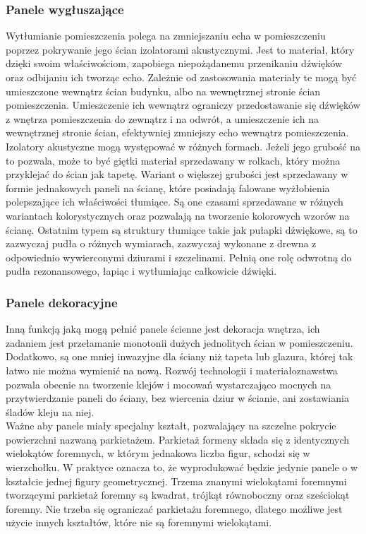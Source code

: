 \documentclass{article} %
\begin{document}
        \subsubsection{Panele wygłuszające}
        Wytłumianie pomieszczenia polega na zmniejszaniu echa w pomieszczeniu poprzez pokrywanie jego ścian izolatorami akustycznymi. Jest to materiał, który dzięki swoim właściwościom, zapobiega niepożądanemu przenikaniu dźwięków oraz odbijaniu ich tworząc echo. Zależnie od zastosowania materiały te mogą być umieszczone wewnątrz ścian budynku, albo na wewnętrznej stronie ścian pomieszczenia. Umieszczenie ich wewnątrz ograniczy przedostawanie się dźwięków z wnętrza pomieszczenia do zewnątrz i na odwrót, a umieszczenie ich na wewnętrznej stronie ścian, efektywniej zmniejszy echo wewnątrz pomieszczenia.
        \\
        
        Izolatory akustyczne mogą występować w różnych formach. Jeżeli jego grubość na to pozwala, może to być giętki materiał sprzedawany w rolkach, który można przyklejać do ścian jak tapetę. Wariant o większej grubości jest sprzedawany w formie jednakowych paneli na ścianę, które posiadają falowane wyżłobienia polepszające ich właściwości tłumiące. Są one czasami sprzedawane w różnych wariantach kolorystycznych oraz pozwalają na tworzenie kolorowych wzorów na ścianę. Ostatnim typem są struktury tłumiące takie jak pułapki dźwiękowe, są to zazwyczaj pudła o różnych wymiarach, zazwyczaj wykonane z drewna z odpowiednio wywierconymi dziurami i szczelinami. Pełnią one rolę odwrotną do pudła rezonansowego, łapiąc i wytłumiając całkowicie dźwięki.
        \\
        
        \subsubsection{Panele dekoracyjne}
        Inną funkcją jaką mogą pełnić panele ścienne jest dekoracja wnętrza, ich zadaniem jest przełamanie monotonii dużych jednolitych ścian w pomieszczeniu. Dodatkowo, są one mniej inwazyjne dla ściany niż tapeta lub glazura, której tak łatwo nie można wymienić na nową. Rozwój technologii i materiałoznawstwa pozwala obecnie na tworzenie klejów i mocowań wystarczająco mocnych na przytwierdzanie paneli do ściany, bez wiercenia dziur w ścianie, ani zostawiania śladów kleju na niej.
        \\
        
        Ważne aby panele miały specjalny kształt, pozwalający na szczelne pokrycie powierzchni nazwaną parkietażem. Parkietaż formeny składa się z identycznych wielokątów foremnych, w którym jednakowa liczba figur, schodzi się w wierzchołku. W praktyce oznacza to, że wyprodukować będzie jedynie panele o w kształcie jednej figury geometrycznej. Trzema znanymi wielokątami foremnymi tworzącymi parkietaż foremny są kwadrat, trójkąt równoboczny oraz sześciokąt foremny. Nie trzeba się ograniczać parkietażu foremnego, dlatego możliwe jest użycie innych kształtów, które nie są foremnymi wielokątami.
        \\
    
\end{document}
